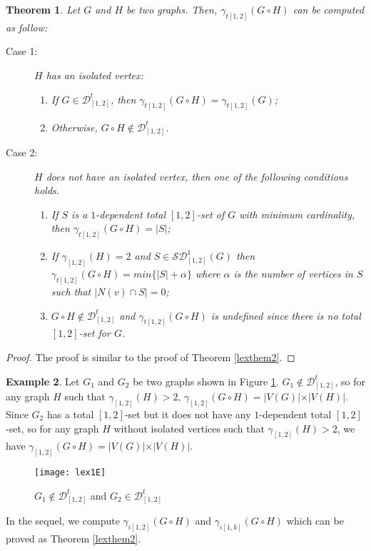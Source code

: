 \documentclass[A4,12pt]{article}
\newtheorem{theorem}{Theorem}[section]
\theoremstyle{definition}
\newtheorem{example}[theorem]{Example}
\theoremstyle{remark}
\begin{document}
\begin{theorem} \label{lexthemt2}
Let $G$ and $H$ be two graphs. Then,  $\gamma_{t[1,2]}(G\circ H)$ can be computed as follow:
\begin{description}
	\item [Case 1:]
	 $H$ has  an isolated vertex:
	\begin{enumerate}
		\item [a)]
  If $G\in \mathcal{D}^t_{[1,2]}$,  then $\gamma_{t[1,2]}(G \circ H)=\gamma_{t[1,2]}(G)$;
  \item [b)]
Otherwise, $G\circ H\notin \mathcal{D}^t_{[1,2]}$.
  \end{enumerate}
   \item [Case 2:]
 	 $H$ does not have  an isolated vertex, then one of the following conditions holds.
 \begin{enumerate}
  \item [a)]
   If $S$ is a $1$-dependent total $[1,2]$-set of $G$ with minimum cardinality, then $\gamma_{t[1,2]}(G \circ H)=\vert S\vert $;
  \item [b)]
   If $\gamma_{[1,2]}(H)=2$ and $S\in \mathcal{SD}^{1}_{[1,2]}(G)$ then $\gamma_{t[1,2]}(G \circ H)=min\{\vert S\vert +\alpha \}
  $ where  $\alpha$ is the number of vertices in $S$ such that $\vert N(v)\cap S\vert =0$;
  \item [c)]
  $G\circ H\notin \mathcal{D}^t_{[1,2]}$ and $\gamma_{t[1,2]}(G\circ H)$ is undefined since there is no total $[1,2]$-set for $G$.
\end{enumerate}
\end{description}
\end{theorem}
 \begin{proof}
 	The proof is similar to the proof of Theorem \ref{lexthem2}.
 \end{proof}

\begin{example}
Let $G_1$ and $G_2$ be two graphs shown in Figure \ref{fig:lex1}. $G_1\notin \mathcal{D}^t_{[1,2]}$, so for any graph $H$ such that $\gamma_{[1,2]}(H)>2$, $\gamma_{[1,2]}(G \circ H)=\vert V(G)\vert \times\vert V(H)\vert $. Since $G_2$  has a total $[1,2]$-set but it does not have any $1$-dependent total $[1,2]$-set, so for any graph $H$ without isolated vertices such that $\gamma_{[1,2]}(H)>2$, we have  $\gamma_{[1,2]}(G \circ H)=\vert V(G)\vert \times\vert V(H)\vert $.
\begin{figure}[h!]
   \centering
     \texttt{[image: lex1E]}
      \caption{$G_1 \notin \mathcal{D}^t_{[1,2]}$ and $G_2 \in \mathcal{D}^t_{[1,2]}$}
      \label{fig:lex1}
\end{figure}
\end{example}
In the sequel, we compute $\gamma_{i[1,2]}(G \circ H)$  and $\gamma_{i[1,k]}(G \circ H)$ which can be proved  as Theorem \ref{lexthem2}.
\end{document}

